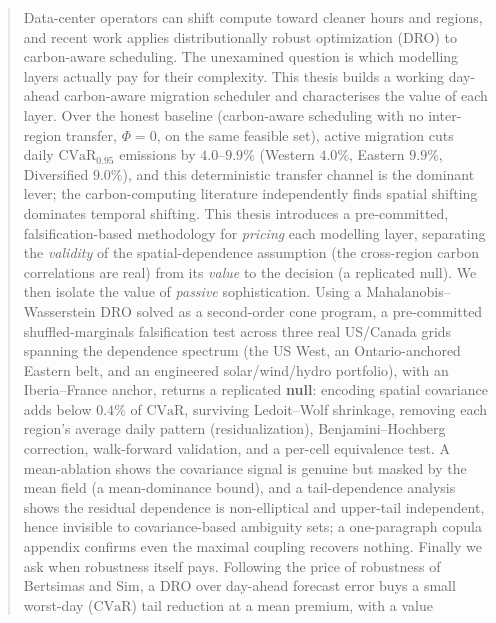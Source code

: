 \documentclass[10pt,twocolumn]{article}
\newcommand{\CVaR}{\mathrm{CVaR}}
\begin{document}
  \begin{@twocolumnfalse}
    \maketitle
    \begin{abstract}\noindent
    Data-center operators can shift compute toward cleaner hours and regions,
and recent work applies distributionally robust optimization (DRO) to carbon-aware
scheduling. The unexamined question is which modelling layers actually pay for their
complexity. This thesis builds a working day-ahead carbon-aware migration scheduler
and characterises the value of each layer. Over the honest baseline (carbon-aware
scheduling with no inter-region transfer, $\Phi=0$, on the same feasible set), active
migration cuts daily $\CVaR_{0.95}$ emissions by $4.0$--$9.9\%$ (Western $4.0\%$, Eastern $9.9\%$, Diversified $9.0\%$), and this deterministic transfer channel is the
dominant lever; the carbon-computing literature independently finds spatial shifting
dominates temporal shifting. This thesis introduces a pre-committed,
falsification-based methodology for \emph{pricing} each modelling layer, separating the
\emph{validity} of the spatial-dependence assumption (the cross-region carbon
correlations are real) from its \emph{value} to the decision (a replicated null). We
then isolate the value of \emph{passive}
sophistication. Using a Mahalanobis--Wasserstein DRO solved as a second-order cone
program, a pre-committed shuffled-marginals falsification test across three real
US/Canada grids spanning the dependence spectrum (the US West, an Ontario-anchored
Eastern belt, and an engineered solar/wind/hydro portfolio), with an Iberia--France
anchor, returns a replicated \textbf{null}: encoding spatial covariance adds below
$0.4\%$ of $\CVaR$, surviving Ledoit--Wolf shrinkage, removing each region's average
daily pattern (residualization),
Benjamini--Hochberg correction, walk-forward validation, and a per-cell equivalence
test. A mean-ablation shows the covariance signal is genuine but masked by the mean
field (a mean-dominance bound), and a tail-dependence analysis shows the residual
dependence is non-elliptical and upper-tail independent, hence invisible to
covariance-based ambiguity sets; a one-paragraph copula appendix confirms even the
maximal coupling recovers nothing. Finally we ask when robustness itself pays.
Following the price of robustness of Bertsimas and Sim, a DRO over day-ahead forecast
error buys a small worst-day ($\CVaR$) tail reduction at a mean premium, with a value

\end{abstract}
\end{@twocolumnfalse}
\end{document}
